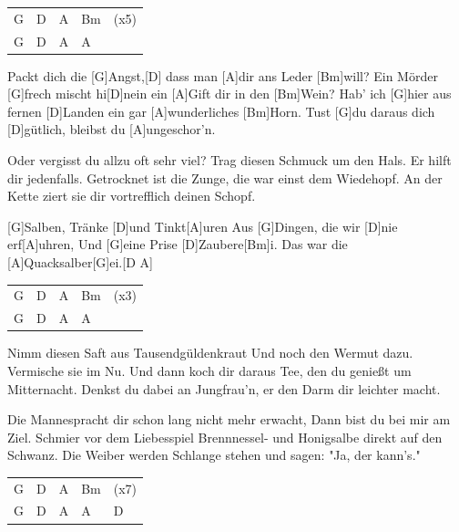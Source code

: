 

\begin{guitar}
	{\footnotesize\begin{tabular}{|l|l|l|l|l}
			G & D & A & Bm & (x5) \\
			G & D & A & A & 
	\end{tabular}}
	
	Packt dich die [G]Angst,[D] dass man [A]dir ans Leder [Bm]will?
	Ein Mörder [G]frech mischt hi[D]nein ein [A]Gift dir in den [Bm]Wein?
	Hab' ich [G]hier aus fernen [D]Landen ein gar [A]wunderliches [Bm]Horn.
	Tust [G]du daraus dich [D]gütlich, bleibst du [A]ungeschor'n.
	
	Oder vergisst du allzu oft sehr viel?
	Trag diesen Schmuck um den Hals. Er hilft dir jedenfalls.
	Getrocknet ist die Zunge, die war einst dem Wiedehopf.
	An der Kette ziert sie dir vortrefflich deinen Schopf.
	
	\begin{highlightbar}
		[G]Salben, Tränke [D]und Tinkt[A]uren
		Aus [G]Dingen, die wir [D]nie erf[A]uhren,
		Und [G]eine Prise [D]Zaubere[Bm]i. Das war die [A]Quacksalber[G]ei.[D A]{}
	\end{highlightbar}
	
	\songsection{Instrumental}
	{\footnotesize\begin{tabular}{|l|l|l|l|l}
			G & D & A & Bm & (x3) \\
			G & D & A & A & 
	\end{tabular}}
	
	\songsection{Strophe 2}
	Nimm diesen Saft aus Tausendgüldenkraut
	Und noch den Wermut dazu. Vermische sie im Nu.
	Und dann koch dir daraus Tee, den du genießt um Mitternacht.
	Denkst du dabei an Jungfrau'n, er den Darm dir leichter macht.
	
	Die Mannespracht dir schon lang nicht mehr erwacht,
	Dann bist du bei mir am Ziel. Schmier vor dem Liebesspiel
	Brennnessel- und Honigsalbe direkt auf den Schwanz.
	Die Weiber werden Schlange stehen und sagen: "Ja, der kann's."
	
	\begin{highlightbar}
		  \optionalChord{(x2)}
	\end{highlightbar}
	
	{\footnotesize\begin{tabular}{|l|l|l|l|l}
			G & D & A & Bm & (x7) \\
			G & D & A & A & D
	\end{tabular}}
\end{guitar}